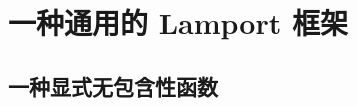 \section{一种通用的 Lamport 框架}\label{sec:14-2}

\begin{definition}\label{def:14-3}
	
\end{definition}

\begin{theorem}\label{theo:14-2}
	
\end{theorem}

\subsection{一种显式无包含性函数}\label{subsec:14-2-1}

\begin{lemma}\label{lemma:14-3}
	
\end{lemma}